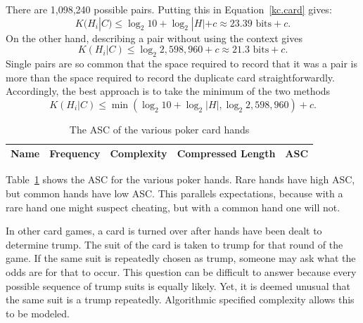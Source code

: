 There are 1,098,240 possible pairs.
Putting this in Equation~\ref{kc.card} gives:
\begin{equation}
    K(H_i|C) \leq \log_2 10 + \log_2 |H| + c \approx 23.39 \mbox{ bits} + c \mbox{.}
\end{equation}
On the other hand, describing a pair without using the context gives
\begin{equation}
    K(H_i|C) \leq \log_2 2,598,960 + c \approx 21.3 \mbox{ bits} + c \mbox{.}
\end{equation}
Single pairs are so common that the space required to record that it was a pair is more than the space required to record the duplicate card straightforwardly. 
Accordingly, the best approach is to take the minimum of the two methods
\begin{equation}
    K(H_i|C) \leq \min(\log_2 10 + \log_2 |H|, \log_2 2,598,960) + c \mbox{.}
\end{equation}

\begin{table}
    \begin{center}
    \begin{tabular}{lllll}
        Name & Frequency & Complexity & Compressed Length & ASC \\
        \hline
        
    \end{tabular}
    \end{center}
    \caption{The ASC of the various poker card hands}
    \label{asc.hands}
\end{table}
Table~\ref{asc.hands} shows the ASC for the various poker hands.
Rare hands have high ASC, but common hands have low ASC.
This parallels expectations, because with a rare hand one might suspect cheating, but with a common hand one will not.

In other card games, a card is turned over after hands have been dealt to determine trump.
The suit of the card is taken to trump for that round of the game.
If the same suit is repeatedly chosen as trump, someone may ask what the odds are for that to occur.
This question can be difficult to answer because every possible sequence of trump suits is equally likely.
Yet, it is deemed unusual that the same suit is a trump repeatedly.
Algorithmic specified complexity allows this to be modeled.


